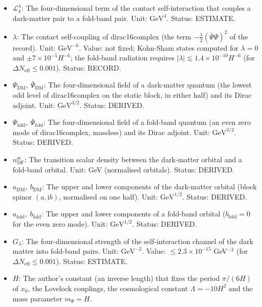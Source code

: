 \documentclass[
  10pt,
]{article}
\providecommand{\tightlist}{%
  \setlength{\itemsep}{0pt}\setlength{\parskip}{0pt}}
\begin{document}
\begin{itemize}
\tightlist
\item
  \(\mathcal{L}_4^{\lambda}\): The four-dimensional term of the contact
  self-interaction that couples a dark-matter pair to a fold-band pair.
  Unit: \(\mathrm{GeV}^{4}\). Status: ESTIMATE.
\item
  \(\lambda\): The contact self-coupling of dirac16complex (the term
  \(-\frac{\lambda}{2}(\bar\Psi\Psi)^2\) of the record). Unit:
  \(\mathrm{GeV}^{-6}\). Value: not fixed; Kohn-Sham states computed for
  \(\lambda = 0\) and \(\pm7\times10^{-5}H^{-6}\); the fold-band
  radiation requires
  \(\lvert\lambda\rvert \lesssim 1.4\times10^{-10}H^{-6}\) (for
  \(\Delta N_{\mathrm{eff}} \le 0.001\)). Status: RECORD.
\item
  \(\Psi_{\mathrm{DM}},\ \bar\Psi_{\mathrm{DM}}\): The four-dimensional
  field of a dark-matter quantum (the lowest odd level of dirac16complex
  on the static block, in either half) and its Dirac adjoint. Unit:
  \(\mathrm{GeV}^{3/2}\). Status: DERIVED.
\item
  \(\Psi_{\mathrm{fold}},\ \bar\Psi_{\mathrm{fold}}\): The
  four-dimensional field of a fold-band quantum (an even zero mode of
  dirac16complex, massless) and its Dirac adjoint. Unit:
  \(\mathrm{GeV}^{3/2}\). Status: DERIVED.
\item
  \(n^{\mathrm{sc}}_{\mathrm{DF}}\): The transition scalar density
  between the dark-matter orbital and a fold-band orbital. Unit: GeV
  (normalised orbitals). Status: DERIVED.
\item
  \(a_{\mathrm{DM}},\ b_{\mathrm{DM}}\): The upper and lower components
  of the dark-matter orbital (block spinor \((a, \mathrm{i}b)\),
  normalised on one half). Unit: \(\mathrm{GeV}^{1/2}\). Status:
  DERIVED.
\item
  \(a_{\mathrm{fold}},\ b_{\mathrm{fold}}\): The upper and lower
  components of a fold-band orbital (\(b_{\mathrm{fold}} = 0\) for the
  even zero mode). Unit: \(\mathrm{GeV}^{1/2}\). Status: DERIVED.
\item
  \(G_\lambda\): The four-dimensional strength of the self-interaction
  channel of the dark matter into fold-band pairs. Unit:
  \(\mathrm{GeV}^{-2}\). Value: \(\le 2.3\times10^{-15}\) GeV\(^{-2}\)
  (for \(\Delta N_{\mathrm{eff}} \le 0.001\)). Status: ESTIMATE.
\item
  \(H\): The author's constant (an inverse length) that fixes the period
  \(\pi/(6H)\) of \(x_0\), the Lovelock couplings, the cosmological
  constant \(\Lambda = -10H^2\) and the mass parameter \(m_\Psi = H\).

\end{itemize}
\end{document}
